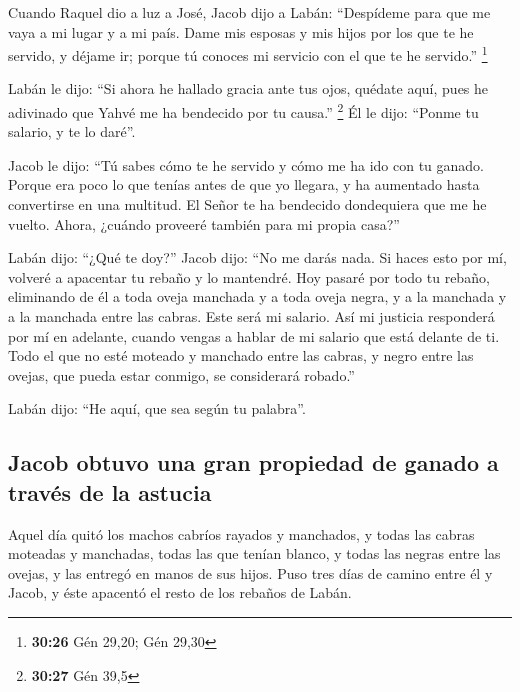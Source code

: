 \begin{paracol}{2}
 Cuando Raquel dio a luz a José, Jacob dijo a Labán:
``Despídeme para que me vaya a mi lugar y a mi país. 
Dame mis esposas y mis hijos por los que te he servido, y déjame ir;
porque tú conoces mi servicio con el que te he servido.'' \footnote{\textbf{30:26}
  Gén 29,20; Gén 29,30}

 Labán le dijo: ``Si ahora he hallado gracia ante tus
ojos, quédate aquí, pues he adivinado que Yahvé me ha bendecido por tu
causa.'' \footnote{\textbf{30:27} Gén 39,5}  Él le dijo:
``Ponme tu salario, y te lo daré''.

 Jacob le dijo: ``Tú sabes cómo te he servido y cómo me
ha ido con tu ganado.  Porque era poco lo que tenías
antes de que yo llegara, y ha aumentado hasta convertirse en una
multitud. El Señor te ha bendecido dondequiera que me he vuelto. Ahora,
¿cuándo proveeré también para mi propia casa?''

 Labán dijo: ``¿Qué te doy?'' Jacob dijo: ``No me darás
nada. Si haces esto por mí, volveré a apacentar tu rebaño y lo
mantendré.  Hoy pasaré por todo tu rebaño, eliminando de
él a toda oveja manchada y a toda oveja negra, y a la manchada y a la
manchada entre las cabras. Este será mi salario.  Así mi
justicia responderá por mí en adelante, cuando vengas a hablar de mi
salario que está delante de ti. Todo el que no esté moteado y manchado
entre las cabras, y negro entre las ovejas, que pueda estar conmigo, se
considerará robado.''

 Labán dijo: ``He aquí, que sea según tu palabra''.

\hypertarget{jacob-obtuvo-una-gran-propiedad-de-ganado-a-travuxe9s-de-la-astucia}{%
\subsection{Jacob obtuvo una gran propiedad de ganado a través de la
astucia}\label{jacob-obtuvo-una-gran-propiedad-de-ganado-a-travuxe9s-de-la-astucia}}

 Aquel día quitó los machos cabríos rayados y manchados,
y todas las cabras moteadas y manchadas, todas las que tenían blanco, y
todas las negras entre las ovejas, y las entregó en manos de sus hijos.
 Puso tres días de camino entre él y Jacob, y éste
apacentó el resto de los rebaños de Labán.


\end{paracol}
